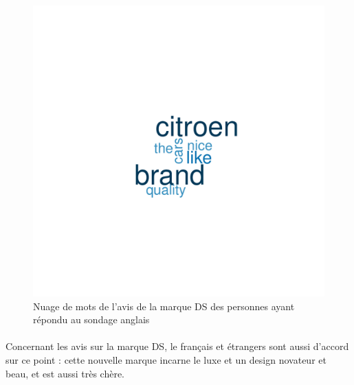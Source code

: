 \documentclass[12pt]{article}\usepackage[]{graphicx}\usepackage[]{color}
\makeatletter
\def\maxwidth{ %
  \ifdim\Gin@nat@width>\linewidth
    \linewidth
  \else
    \Gin@nat@width
  \fi
}
\newenvironment{knitrout}{}{} %
\makeatother
\begin{document}
\begin{knitrout}
\color{fgcolor}\begin{figure}[H]
\includegraphics[width=\maxwidth]{figure/brand_en-1} \caption[Nuage de mots de l'avis de la marque DS des personnes ayant répondu au sondage anglais]{Nuage de mots de l'avis de la marque DS des personnes ayant répondu au sondage anglais}\label{fig:brand en}
\end{figure}


\end{knitrout}

\paragraph{} Concernant les avis sur la marque DS, le français et étrangers
sont aussi d'accord sur ce point : cette nouvelle marque incarne le luxe et un
design novateur et beau, et est aussi très chère.
\end{document}
